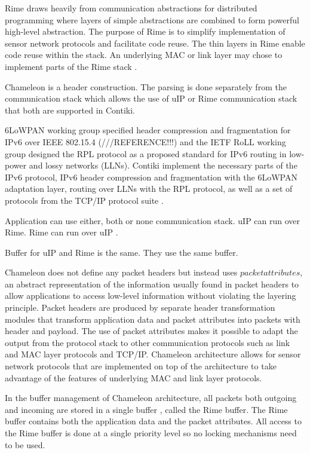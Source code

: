 Rime draws heavily from communication abstractions for distributed programming where layers of simple abstractions are combined to form powerful high-level abstraction. The purpose of Rime is to simplify implementation of sensor network protocols and facilitate code reuse. The thin layers in Rime enable code reuse within the stack. An underlying MAC or link layer may chose to implement parts of the Rime stack \cite{rimeposter}.

Chameleon is a header construction. The parsing is done separately from the communication stack which allows the use of uIP or Rime communication stack that both are supported in Contiki.

6LoWPAN working group specified header compression and fragmentation for IPv6 over IEEE 802.15.4 (///REFERENCE!!!) and the IETF RoLL working group designed the RPL protocol as a proposed standard for IPv6 routing in low-power and lossy networks (LLNs). Contiki implement the necessary parts of the IPv6 protocol, IPv6 header compression and fragmentation with the 6LoWPAN adaptation layer, routing over LLNs with the RPL protocol, as well as a set of protocols from the TCP/IP protocol suite \cite{beyondInteroperability}.

Application can use either, both or none communication stack. uIP can run over Rime. Rime can run over uIP \cite{contikitutorial}. 

Buffer for uIP and Rime is the same. They use the same buffer.
 
Chameleon does not define any packet headers but instead uses $packet attributes$, an abstract representation of the information usually found in packet headers to allow applications to access low-level information without violating the layering principle. Packet headers are produced by separate header transformation modules that transform application data and packet attributes into packets with header and payload. The use of packet attributes makes it possible to adapt the output from the protocol stack to other communication protocols such as link and MAC layer protocols and TCP/IP.
Chameleon architecture allows for sensor network protocols that are implemented on top of the architecture to take advantage of the features of underlying MAC and link layer protocols.

In the buffer management of Chameleon architecture, all packets both outgoing and incoming are stored in a single buffer \cite{rimeposter}, called the Rime buffer. The Rime buffer contains both the application data and the packet attributes. All access to the Rime buffer is done at a single priority level so no locking mechanisms need to be used.

